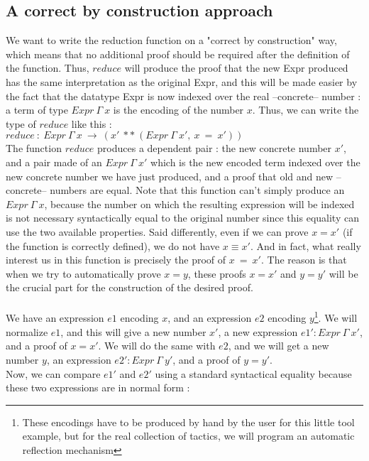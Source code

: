 \subsection{A correct by construction approach}

We want to write the reduction function on a "correct by construction" way, which means that no additional proof should be required after the definition of the function. Thus, $reduce$ will produce the proof that the new Expr produced has the same interpretation as the original Expr, and this will be made easier by the fact that the datatype Expr is now indexed over the real --concrete-- number : a term of type $Expr\ \Gamma\ x$ is the encoding of the number $x$.
Thus, we can write the type of $reduce$ like this : \\
$reduce\ :\ Expr\ \Gamma\ x\ \rightarrow\ (x'\ **\ (Expr\ \Gamma\ x',\ x\ =\ x'))$ \\
The function $reduce$ produces a dependent pair : the new concrete number $x'$, and a pair made of an $Expr\ \Gamma\ x'$ which is the new encoded term indexed over the new concrete number we have just produced, and a proof that old and new --concrete-- numbers are equal.
Note that this function can't simply produce an $Expr\ \Gamma\ x$, because the number on which the resulting expression will be indexed is not necessary syntactically equal to the original number since this equality can use the two available properties. Said differently, even if we can prove $x=x'$ (if the function is correctly defined), we do not have $x \equiv x'$.
And in fact, what really interest us in this function is precisely the proof of $x\ =\ x'$.
The reason is that when we try to automatically prove $x=y$, these proofs $x=x'$ and $y=y'$ will be the crucial part for the construction of the desired proof. \\
\\
We have an expression $e1$ encoding $x$, and an expression $e2$ encoding $y$\footnote{These encodings have to be produced by hand by the user for this little tool example, but for the real collection of tactics, we will program an automatic reflection mechanism}.
We will normalize $e1$, and this will give a new number $x'$, a new expression $e1':Expr\ \Gamma\ x'$, and a proof of $x=x'$. We will do the same with $e2$, and we will get a new number $y$, an expression $e2':Expr\ \Gamma\ y'$, and a proof of $y=y'$. \\
Now, we can compare $e1'$ and $e2'$ using a standard syntactical equality because these two expressions are in normal form :

